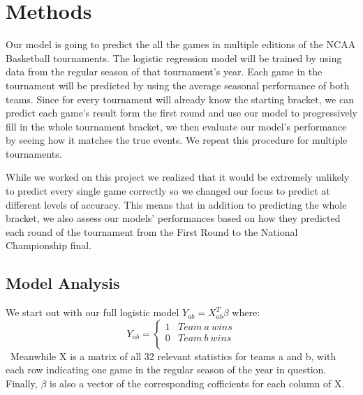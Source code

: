 \documentclass{article} %
\begin{document}


\section{Methods}
\label{gen_inst}

Our model is going to predict the all the games in multiple editions of the NCAA Basketball tournaments. The logistic regression model will be trained by using data from the regular season of that tournament's year. Each game in the tournament will be predicted by using the average seasonal performance of both teams. Since for every tournament will already know the starting bracket, we can predict each game's result form the first round and use our model to progressively fill in the whole tournament bracket, we then evaluate our model's performance by seeing how it matches the true events. We repeat this procedure for multiple tournaments.

While we worked on this project we realized that it would be extremely unlikely to predict every single game correctly so we changed our focus to predict at different levels of accuracy. This means that in addition to predicting the whole bracket, we also assess our models' performances based on how they predicted each round of the tournament from the First Round to the National Championship final.




\subsection{Model Analysis}

We start out with our full logistic model $Y_{ab} = X_{ab}^T \beta$ where:\
\[ Y_{ab} = \left\{
  \begin{array}{ll}
  1 & Team \ a \ wins \\
  0 &  Team \ b \ wins \\
  \end{array} 
  \right. \]\
Meanwhile X is a matrix of all 32 relevant statistics for teams a and b, with each row indicating one game in the regular season of the year in question. Finally, $\beta$ is also a vector of the corresponding cofficients for each column of X.\
\end{document}
